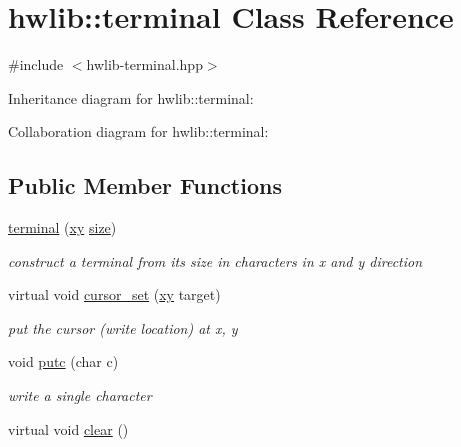 \hypertarget{classhwlib_1_1terminal}{}\section{hwlib\+:\+:terminal Class Reference}
\label{classhwlib_1_1terminal}


{\ttfamily \#include $<$hwlib-\/terminal.\+hpp$>$}



Inheritance diagram for hwlib\+:\+:terminal\+:


Collaboration diagram for hwlib\+:\+:terminal\+:
\subsection*{Public Member Functions}
\begin{DoxyCompactItemize}
\item 
\mbox{\label{classhwlib_1_1terminal_af55bf18e347959a373bba863cdbdb27a}} 
\hyperlink{classhwlib_1_1terminal_af55bf18e347959a373bba863cdbdb27a}{terminal} (\hyperlink{classhwlib_1_1xy}{xy} \hyperlink{classhwlib_1_1terminal_ae9a152d0d8d1c1e0de12e9f363e46224}{size})
\begin{DoxyCompactList}\small\item\em construct a terminal from its size in characters in x and y direction \end{DoxyCompactList}\item 
\mbox{\label{classhwlib_1_1terminal_ad03a78feb552449609cacd9ffce4cb6e}} 
virtual void \hyperlink{classhwlib_1_1terminal_ad03a78feb552449609cacd9ffce4cb6e}{cursor\+\_\+set} (\hyperlink{classhwlib_1_1xy}{xy} target)
\begin{DoxyCompactList}\small\item\em put the cursor (write location) at x, y \end{DoxyCompactList}\item 
\mbox{\label{classhwlib_1_1terminal_abce5e677f5eb98ecf53f9d8b617fb206}} 
void \hyperlink{classhwlib_1_1terminal_abce5e677f5eb98ecf53f9d8b617fb206}{putc} (char c)
\begin{DoxyCompactList}\small\item\em write a single character \end{DoxyCompactList}\item 
virtual void \hyperlink{classhwlib_1_1terminal_a89b385b6e92fd9d37e7ac16126ba8f32}{clear} ()
\end{DoxyCompactItemize}
